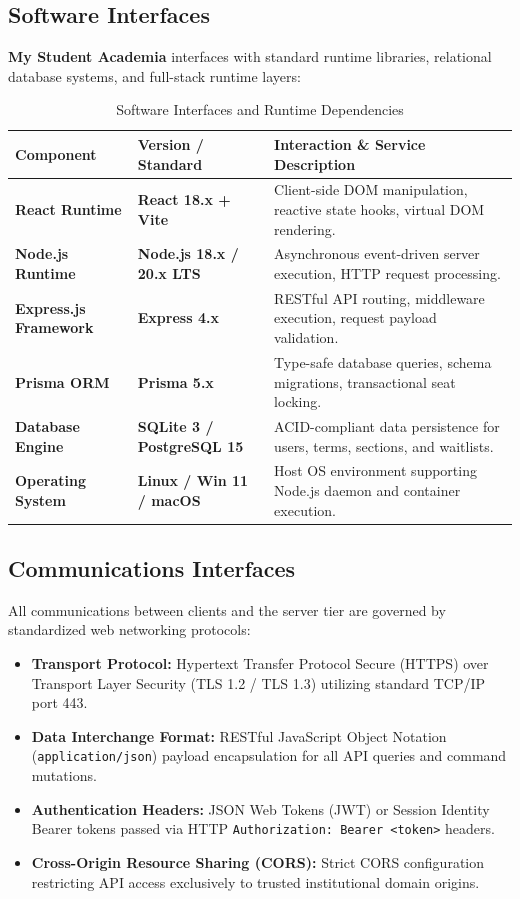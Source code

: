 \documentclass[a4paper,12pt]{article}
\begin{document}
\subsection{Software Interfaces}
\textbf{My Student Academia} interfaces with standard runtime libraries, relational database systems, and full-stack runtime layers:
\begin{table}[H]
\centering
\small
\renewcommand{\arraystretch}{1.3}
\begin{tabularx}{\textwidth}{>{\bfseries}p{3.2cm} >{\bfseries}p{3.2cm} >{\raggedright\arraybackslash}X}
\toprule
\textbf{Component} & \textbf{Version / Standard} & \textbf{Interaction \& Service Description} \\
\midrule
React Runtime & React 18.x + Vite & Client-side DOM manipulation, reactive state hooks, virtual DOM rendering. \\
Node.js Runtime & Node.js 18.x / 20.x LTS & Asynchronous event-driven server execution, HTTP request processing. \\
Express.js Framework & Express 4.x & RESTful API routing, middleware execution, request payload validation. \\
Prisma ORM & Prisma 5.x & Type-safe database queries, schema migrations, transactional seat locking. \\
Database Engine & SQLite 3 / PostgreSQL 15 & ACID-compliant data persistence for users, terms, sections, and waitlists. \\
Operating System & Linux / Win 11 / macOS & Host OS environment supporting Node.js daemon and container execution. \\
\bottomrule
\end{tabularx}
\caption{Software Interfaces and Runtime Dependencies}
\end{table}

\subsection{Communications Interfaces}
All communications between clients and the server tier are governed by standardized web networking protocols:
\begin{itemize}[leftmargin=1.2cm]
    \item \textbf{Transport Protocol:} Hypertext Transfer Protocol Secure (HTTPS) over Transport Layer Security (TLS 1.2 / TLS 1.3) utilizing standard TCP/IP port 443.
    \item \textbf{Data Interchange Format:} RESTful JavaScript Object Notation (\texttt{application/json}) payload encapsulation for all API queries and command mutations.
    \item \textbf{Authentication Headers:} JSON Web Tokens (JWT) or Session Identity Bearer tokens passed via HTTP \texttt{Authorization: Bearer <token>} headers.
    \item \textbf{Cross-Origin Resource Sharing (CORS):} Strict CORS configuration restricting API access exclusively to trusted institutional domain origins.
\end{itemize}
\end{document}
